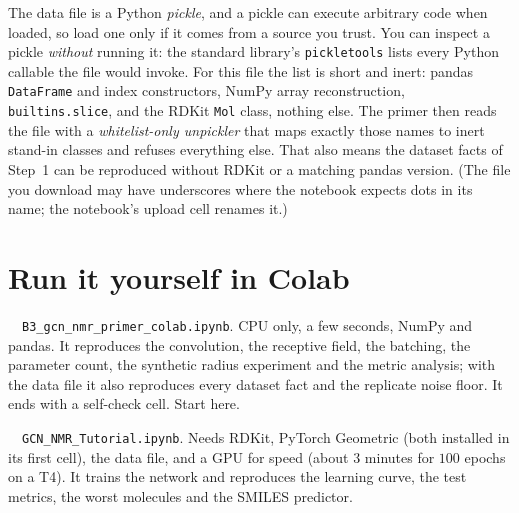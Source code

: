 \documentclass[11pt]{article}
\newcommand{\colaburlfull}{https://colab.research.google.com/github/YOUR-USER/YOUR-REPO/blob/main/notebooks/GCN_NMR_Tutorial.ipynb}
\newcommand{\colaburlprimer}{https://colab.research.google.com/github/YOUR-USER/YOUR-REPO/blob/main/notebooks/B3_gcn_nmr_primer_colab.ipynb}
\newcommand{\colabbutton}[2]{%
  \href{#1}{\tcbox[on line,colback=orange!15,colframe=orange!70!black,boxrule=0.6pt,arc=3pt,
    left=4pt,right=4pt,top=1pt,bottom=1pt]{\small\textbf{$\blacktriangleright$ #2}}}}
\begin{document}
\begin{warnbox}
The data file is a Python \emph{pickle}, and a pickle can execute arbitrary code when loaded, so load one only if it comes from a source you trust. You can inspect a pickle \emph{without} running it: the standard library's \texttt{pickletools} lists every Python callable the file would invoke. For this file the list is short and inert: pandas \texttt{DataFrame} and index constructors, NumPy array reconstruction, \texttt{builtins.slice}, and the RDKit \texttt{Mol} class, nothing else. The primer then reads the file with a \emph{whitelist-only unpickler} that maps exactly those names to inert stand-in classes and refuses everything else. That also means the dataset facts of Step~1 can be reproduced without RDKit or a matching pandas version. (The file you download may have underscores where the notebook expects dots in its name; the notebook's upload cell renames it.)
\end{warnbox}

\section{Run it yourself in Colab}
\label{sec:runit}
\begin{keybox}
\begin{description}[leftmargin=0pt, nosep, labelindent=0pt]
  \item[Primer] \colabbutton{\colaburlprimer}{Open the primer}\ \ \texttt{B3\_gcn\_nmr\_primer\_colab.ipynb}. CPU only, a few seconds, NumPy and pandas. It reproduces the convolution, the receptive field, the batching, the parameter count, the synthetic radius experiment and the metric analysis; with the data file it also reproduces every dataset fact and the replicate noise floor. It ends with a self-check cell. Start here.
  \item[Full tutorial] \colabbutton{\colaburlfull}{Open the full tutorial}\ \ \texttt{GCN\_NMR\_Tutorial.ipynb}. Needs RDKit, PyTorch Geometric (both installed in its first cell), the data file, and a GPU for speed (about $3$ minutes for $100$ epochs on a T4). It trains the network and reproduces the learning curve, the test metrics, the worst molecules and the SMILES predictor.
\end{description}
\end{keybox}
\end{document}
